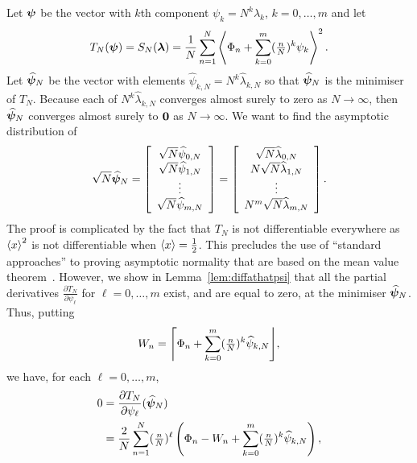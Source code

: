 \documentclass[journal]{IEEEtran}
\begin{document}
Let $\boldsymbol{\psi}$ be the vector with $k$th component $\psi_k = N^k \lambda_k$, $k=0, \dots, m$ and let 
\[
T_{N}(\boldsymbol{\psi}) = S_N(\boldsymbol{\lambda}) = \frac{1}{N} \sum_{n=1}^{N} \left\langle  \Phi_n + \sum_{k=0}^m (\tfrac{n}{N})^k \psi_k  \right\rangle^2.
\]
Let $\widehat{\boldsymbol{\psi}}_N$ be the vector with elements $\widehat{\psi}_{k,N} = N^k \widehat{\lambda}_{k,N}$ so that $\widehat{\boldsymbol{\psi}}_N$ is the minimiser of $T_N$.  Because each of $N^k \widehat{\lambda}_{k,N}$ converges almost surely to zero as $N \rightarrow \infty$, then $\widehat{\boldsymbol{\psi}}_{N}$ converges almost surely to $\boldsymbol{0}$ as $N \rightarrow \infty$.  We want to find the asymptotic distribution of
\[
\sqrt{N}\widehat{\psibf}_{N} = 
\left[
\begin{array}
[c]{c}%
\sqrt{N} \widehat{\psi}_{0,N} \\ \sqrt{N}\widehat{\psi}_{1,N}  \\ \vdots \\ \sqrt{N} \widehat{\psi}_{m,N}
\end{array}
\right]
=
\left[
\begin{array}
[c]{c}%
\sqrt{N} \widehat{\lambda}_{0,N} \\ N\sqrt{N}\widehat{\lambda}_{1,N} \\ \vdots \\ N^m\sqrt{N} \widehat{\lambda}_{m,N}
\end{array}
\right].
\]
The proof is complicated by the fact that $T_N$ is not differentiable everywhere as $\left\langle x \right\rangle^2$ is not differentiable when $\left\langle x \right\rangle = \tfrac{1}{2}$.  This precludes the use of ``standard approaches'' to proving asymptotic normality that are based on the mean value theorem~\cite{vonMises_diff_stats_1947,vanDerVart1971_asymptotic_stats,Pollard_new_ways_clts_1986,Pollard_conv_stat_proc_1984,Pollard_asymp_empi_proc_1989}.  However, we show in Lemma~\ref{lem:diffathatpsi} that all the partial derivatives $\frac{\partial T_N}{\partial \psi_\ell}$ for $\ell = 0, \dots, m$ exist, and are equal to zero, at the minimiser $\widehat{\boldsymbol{\psi}}_N$.  Thus, putting
\begin{equation}\label{eq:Wn}
W_{n} = \round{\Phi_n + \sum_{k=0}^m (\tfrac{n}{N})^k \widehat{\psi}_{k,N}},
\end{equation}
we have, for each $\ell = 0, \dots, m$,
\begin{align*}
0 & = \frac{\partial T_N}{\partial \psi_\ell}(\widehat{\boldsymbol{\psi}}_N)\\
&= \frac{2}{N}\sum_{n=1}^{N}(\tfrac{n}{N})^\ell\left( \Phi_n - W_{n}+ \sum_{k=0}^{m}(\tfrac{n}{N})^k \widehat{\psi}_{k,N}  \right),
\end{align*}
\end{document}
